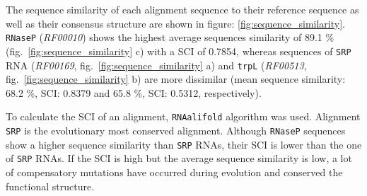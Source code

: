 \documentclass[ twoside,openright,titlepage,numbers=noenddot,headinclude,%
                footinclude=false, cleardoublepage=empty,abstractoff, %
                BCOR=5mm,paper=a4,fontsize=11pt,%
                ngerman,american,%
                ]{scrreprt}
\begin{document}
The sequence similarity of each alignment sequence to their reference sequence as well as their consensus structure are shown in figure: \ref{fig:sequence_similarity}. 
\texttt{RNaseP} (\textit{RF00010}) shows the highest
average sequences similarity of 89.1 \% (fig.~\ref{fig:sequence_similarity} c) with a SCI of 0.7854, whereas
sequences of \texttt{SRP} RNA (\textit{RF00169}, fig.~\ref{fig:sequence_similarity} a) and \texttt{trpL} (\textit{RF00513}, fig.~\ref{fig:sequence_similarity} b) are
more dissimilar (mean sequence similarity: 68.2 \%, SCI: 0.8379 and 65.8
\%, SCI: 0.5312, respectively).

To calculate the SCI of an alignment, \texttt{RNAalifold} algorithm\cite{RNAalifold} was used.
Alignment \texttt{SRP} is the evolutionary most conserved alignment.
Although \texttt{RNaseP}  sequences show a higher sequence similarity than
\texttt{SRP} RNAs, their SCI is lower than the one of \texttt{SRP}
RNAs.
If the SCI is high but the average sequence similarity is low, a lot of
compensatory mutations have occurred during evolution and conserved the
functional structure.





\end{document}
